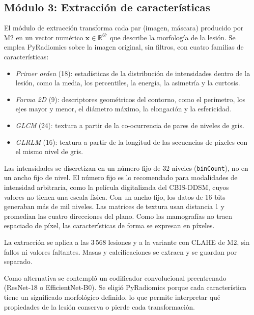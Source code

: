 
\subsection{Módulo 3: Extracción de características}

El módulo de extracción transforma cada par (imagen, máscara) producido por M2 en un vector
numérico $\mathbf{x}\in\mathbb{R}^{67}$ que describe la morfología de la lesión. Se emplea
PyRadiomics \cite{vanGriethuysen2017} sobre la imagen original, sin filtros, con cuatro familias de
características:

\begin{itemize}
  \item \textit{Primer orden} (18): estadísticas de la distribución de intensidades dentro de la
        lesión, como la media, los percentiles, la energía, la asimetría y la curtosis.
  \item \textit{Forma 2D} (9): descriptores geométricos del contorno, como el perímetro, los
        ejes mayor y menor, el diámetro máximo, la elongación y la esfericidad.
  \item \textit{GLCM} (24): textura a partir de la co-ocurrencia de pares de niveles de gris.
  \item \textit{GLRLM} (16): textura a partir de la longitud de las secuencias de píxeles con el
        mismo nivel de gris.
\end{itemize}

Las intensidades se discretizan en un número fijo de 32 niveles (\texttt{binCount}), no en un
ancho fijo de nivel. El número fijo es lo recomendado para modalidades de intensidad arbitraria,
como la película digitalizada del CBIS-DDSM, cuyos valores no tienen una escala física. Con un ancho
fijo, los datos de 16 bits generaban más de mil niveles. Las matrices de textura usan distancia 1 y
promedian las cuatro direcciones del plano. Como las mamografías no traen espaciado de píxel, las
características de forma se expresan en píxeles.

La extracción se aplica a las 3\,568 lesiones y a la variante con CLAHE de M2, sin fallos ni
valores faltantes. Masas y calcificaciones se extraen y se guardan por separado.

Como alternativa se contempló un codificador convolucional preentrenado
(ResNet-18 o EfficientNet-B0). Se eligió PyRadiomics porque cada característica tiene un significado morfológico
definido, lo que permite interpretar qué propiedades de la lesión conserva o pierde cada
transformación.
